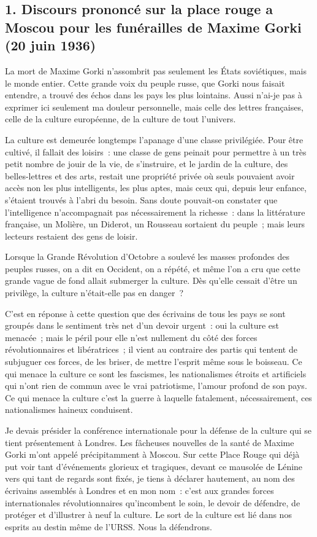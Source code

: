 \documentclass[french,twoside]{book} %
\begin{document}
\subsection[{1. Discours prononcé sur la place rouge a Moscou pour les funérailles de Maxime Gorki (20 juin 1936)}]{1. Discours prononcé sur la place rouge a Moscou pour les funérailles de Maxime Gorki (20 juin 1936)}
\noindent La mort de Maxime Gorki n’assombrit pas seulement les États soviétiques, mais le monde entier. Cette grande voix du peuple russe, que Gorki nous faisait entendre, a trouvé des échos dans les pays les plus lointains. Aussi n’ai-je pas à exprimer ici seulement ma douleur personnelle, mais celle des lettres françaises, celle de la culture européenne, de la culture de tout l’univers.\par
La culture est demeurée longtemps l’apanage d’une classe privilégiée. Pour être cultivé, il fallait des loisirs : une classe de gens peinait pour permettre à un très petit nombre de jouir de la vie, de s’instruire, et le jardin de la culture, des belles-lettres et des arts, restait une propriété privée où seuls pouvaient avoir accès non les plus intelligents, les plus aptes, mais ceux qui, depuis leur enfance, s’étaient trouvés à l’abri du besoin. Sans doute pouvait-on constater que l’intelligence n’accompagnait pas nécessairement la richesse : dans la littérature française, un Molière, un Diderot, un Rousseau sortaient du peuple ; mais leurs lecteurs restaient des gens de loisir.\par
Lorsque la Grande Révolution d’Octobre a soulevé les masses profondes des peuples russes, on a dit en Occident, on a répété, et même l’on a cru que cette grande vague de fond allait submerger la culture. Dès qu’elle cessait d’être un privilège, la culture n’était-elle pas en danger ?\par
C’est en réponse à cette question que des écrivains de tous les pays se sont groupés dans le sentiment très net d’un devoir urgent : oui la culture est menacée ; mais le péril pour elle n’est nullement du côté des forces révolutionnaires et libératrices ; il vient au contraire des partis qui tentent de subjuguer ces forces, de les briser, de mettre l’esprit même sous le boisseau. Ce qui menace la culture ce sont les fascismes, les nationalismes étroits et artificiels qui n’ont rien de commun avec le vrai patriotisme, l’amour profond de son pays. Ce qui menace la culture c’est la guerre à laquelle fatalement, nécessairement, ces nationalismes haineux conduisent.\par
Je devais présider la conférence internationale pour la défense de la culture qui se tient présentement à Londres. Les fâcheuses nouvelles de la santé de Maxime Gorki m’ont appelé précipitamment à Moscou. Sur cette Place Rouge qui déjà put voir tant d’événements glorieux et tragiques, devant ce mausolée de Lénine vers qui tant de regards sont fixés, je tiens à déclarer hautement, au nom des écrivains assemblés à Londres et en mon nom : c’est aux grandes forces internationales révolutionnaires qu’incombent le soin, le devoir de défendre, de protéger et d’illustrer à neuf la culture. Le sort de la culture est lié dans nos esprits au destin même de l’URSS. Nous la défendrons.\par
\end{document}
